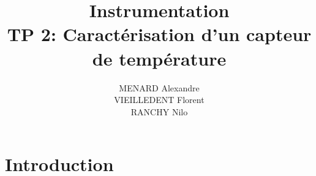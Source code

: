 \documentclass[12pt]{article}
\title{\textbf{Instrumentation} \\ TP 2: Caractérisation d'un capteur de température}
\author{MENARD Alexandre \\ VIEILLEDENT Florent \\ RANCHY Nilo}
\begin{document}
\maketitle

\section*{Introduction}



\newpage
\end{document}
